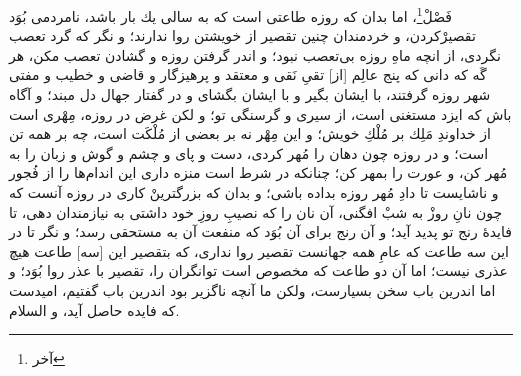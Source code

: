 فَصْلْ\footnote{آخر}، اما بدان كه روزه طاعتى است كه به سالى يك بار باشد، نامردمى بُوَد تقصيرْكردن، و خردمندان چنين تقصير از خويشتن روا ندارند؛ و نگر كه گرد تعصب نگردى، از انچه ماهِ روزه بى‌تعصب نبود؛ و اندر گرفتن روزه و گشادن تعصب مكن، هر گَه كه دانى كه پنج عالِم [از] تقیِ نَقى و معتقد و پرهيزگار و قاضى و خطيب و مفتى شهر روزه گرفتند، با ايشان بگير و با ايشان بگشاى و در گفتار جهال دل مبند؛ و آگاه باش كه ايزد مستغنى است، از سيرى و گرسنگى تو؛ و لكن غرض در روزه، مِهْرى است از خداوندِ مَلِك بر مُلْكِ خويش؛ و اين مِهْر نه بر بعضى از مُلْكَت است، چه بر همه تن است؛ و در روزه چون دهان را مُهر كردى، دست و پاى و چشم و گوش و زبان را به مُهر كن، و عورت را بمهر كن؛ چنانكه در شرط است منزه دارى اين اندام‌ها را از فُجور و ناشايست تا دادِ مُهر روزه بداده باشى؛ و بدان كه بزرگترينْ كارى در روزه آنست كه چون نانِ روزْ به شبْ افگنى، آن نان را كه نصيبِ روزِ خود داشتى به نيازمندان دهى، تا فايدۀ رنج تو پديد آيد؛ و آن رنج براى آن بُوَد كه منفعت آن به مستحقى رسد؛ و نگر تا در اين سه طاعت كه عامِ همه جهانست تقصير روا ندارى، كه بتقصير اين [سه] طاعت هيچ عذرى نيست؛ اما آن دو طاعت كه مخصوص است توانگران را، تقصير با عذر روا بُوَد؛ و اما اندرين باب سخن بسيارست، ولكن ما آنچه ناگزير بود اندرين باب گفتيم، اميدست كه فايده حاصل آيد، و السلام.

\newpage

